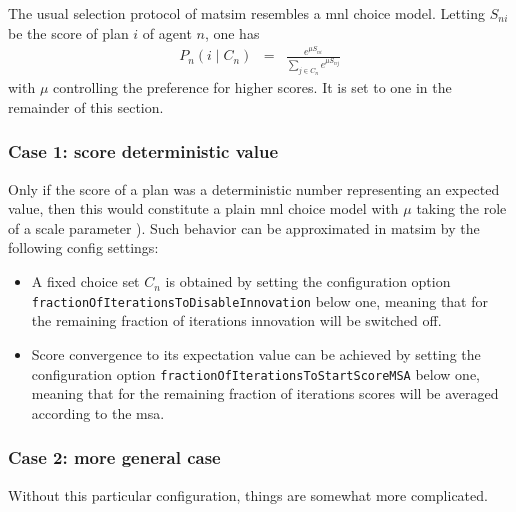 The usual selection protocol of \gls{matsim} resembles a \gls{mnl}
choice model. Letting $S_{ni}$ be the score of plan $i$ of agent
$n$, one has
\begin{eqnarray}
P_{n}(i\mid C_{n}) & = & \frac{e^{\mu S_{ni}}}{\sum_{j\in C_{n}}e^{\mu S_{nj}}}\label{eq:ExpBetaPlanSelector}
\end{eqnarray}
with $\mu$ controlling the preference for higher scores.
It is set to one in the remainder of this section. 

\subsubsection{Case 1: score deterministic value}

Only if the score
of a plan was a deterministic number representing an expected value, 
then this would constitute a plain \gls{mnl} choice model with $\mu$ taking the role
of a scale parameter \citep[see, e.g.,][p.45]{Train_2003}). 
Such behavior 
can be approximated in \acrshort{matsim} by the following config settings:
\begin{itemize}
\styleItemize
\item A fixed choice set $C_n$ is obtained by setting the configuration option \verb$fractionOfIterationsToDisableInnovation$ below one,  
meaning that for the remaining fraction of iterations innovation will be switched off.
\item Score convergence to its expectation value can be achieved by setting the configuration option \verb$fractionOfIterationsToStartScoreMSA$ below one, 
meaning that for the remaining fraction of iterations scores will be averaged according to the \acrfull{msa}.
\end{itemize}
%

\subsubsection{Case 2: more general case}

Without this particular configuration, things are somewhat more complicated.

